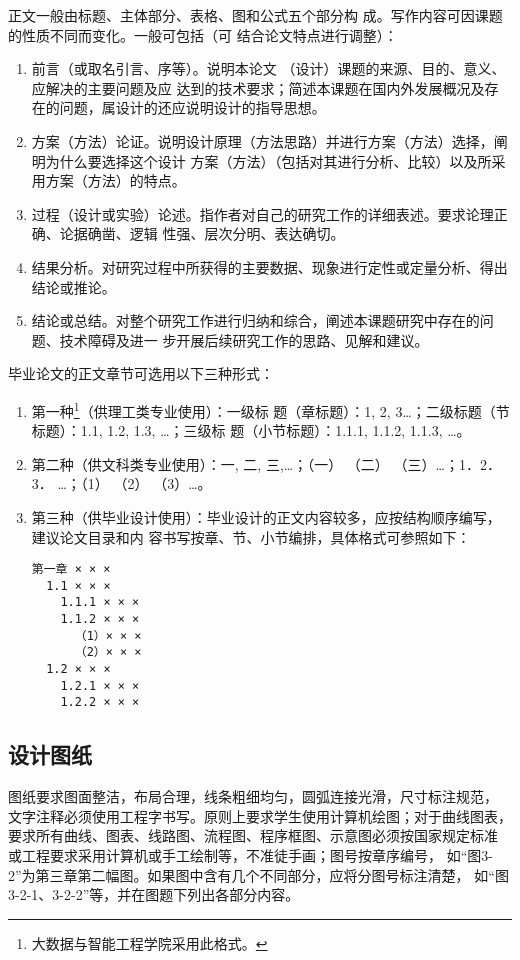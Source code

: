 正文一般由标题、主体部分、表格、图和公式五个部分构
成。写作内容可因课题的性质不同而变化。一般可包括（可
结合论文特点进行调整）：
\begin{enumerate}
\item 前言（或取名引言、序等）。说明本论文 （设计）课题的来源、目的、意义、应解决的主要问题及应
  达到的技术要求；简述本课题在国内外发展概况及存在的问题，属设计的还应说明设计的指导思想。
\item 方案（方法）论证。说明设计原理（方法思路）并进行方案（方法）选择，阐明为什么要选择这个设计
  方案（方法）（包括对其进行分析、比较）以及所采用方案（方法）的特点。
\item 过程（设计或实验）论述。指作者对自己的研究工作的详细表述。要求论理正确、论据确凿、逻辑
  性强、层次分明、表达确切。
\item 结果分析。对研究过程中所获得的主要数据、现象进行定性或定量分析、得出结论或推论。
\item 结论或总结。对整个研究工作进行归纳和综合，阐述本课题研究中存在的问题、技术障碍及进一
  步开展后续研究工作的思路、见解和建议。
\end{enumerate}
\medskip
毕业论文的正文章节可选用以下三种形式：
\begin{enumerate}
\item 第一种\footnote{大数据与智能工程学院采用此格式。}（供理工类专业使用）：一级标
  题（章标题）：1, 2, 3\ldots；二级标题（节标题）：1.1, 1.2, 1.3, \ldots；三级标
  题（小节标题）：1.1.1, 1.1.2, 1.1.3, \ldots。
\item 第二种（供文科类专业使用）：一, 二, 三,\ldots；（一） （二） （三）\ldots；1．2．3．
  \ldots；（1） （2） （3）\ldots。
\item 第三种（供毕业设计使用）：毕业设计的正文内容较多，应按结构顺序编写，建议论文目录和内
  容书写按章、节、小节编排，具体格式可参照如下：
\begin{verbatim}
第一章 × × ×
  1.1 × × ×
    1.1.1 × × ×
    1.1.2 × × ×
      （1）× × ×
      （2）× × ×
  1.2 × × ×
    1.2.1 × × ×
    1.2.2 × × ×
\end{verbatim}
\end{enumerate}

\subsection{设计图纸}

图纸要求图面整洁，布局合理，线条粗细均匀，圆弧连接光滑，尺寸标注规范，
文字注释必须使用工程字书写。原则上要求学生使用计算机绘图；对于曲线图表，
要求所有曲线、图表、线路图、流程图、程序框图、示意图必须按国家规定标准
或工程要求采用计算机或手工绘制等，不准徒手画；图号按章序编号，
如“图3-2”为第三章第二幅图。如果图中含有几个不同部分，应将分图号标注清楚，
如“图3-2-1、3-2-2”等，并在图题下列出各部分内容。

